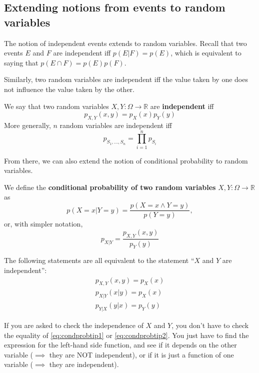 \documentclass{report}
\begin{document}
\subsection{Extending notions from events to random variables}
The notion of independent events extends to random variables. Recall that two events $E$ and $F$ are independent iff $p(E|F) = p(E)$, which is equivalent to saying that $p(E \cap F) = p(E)p(F)$. 

Similarly, two random variables are independent iff the value taken by one does not influence the value taken by the other.

\begin{defn}
	We say that two random variables $X, Y: \Omega \to \mathbb{R}$ are \textbf{independent} iff 
	\begin{equation}
		p_{X, Y}(x,y) = p_X(x)p_Y(y)
	\end{equation}
	More generally, $n$ random variables are independent iff
	\begin{equation}
		p_{S_1, \ldots, S_n} = \prod_{i=1}^n p_{S_i}
	\end{equation}
\end{defn}

\noindent From there, we can also extend the notion of conditional probability to random variables.
\begin{defn}
We define the \textbf{conditional probability of two random variables} $X, Y: \Omega \to \mathbb{R}$ as
\begin{equation}
	p(X=x | Y=y) = \dfrac{p(X=x \land Y=y)}{p(Y=y)},
\end{equation}
or, with simpler notation,
\begin{equation}
	p_{X|Y} = \dfrac{p_{X, Y}(x, y)}{p_Y(y)}
\end{equation}
\end{defn}

\begin{remark} The following statements are all equivalent to the statement ``$X$ and $Y$ are independent'':
\begin{align}
	p_{X, Y}(x, y) = p_X(x) \\
	\label{eq:condprobtip1}
	p_{X|Y}(x|y) = p_X(x) \\
	\label{eq:condprobtip2}
	p_{Y|X}(y|x) = p_Y(y)
\end{align}
\end{remark}

\begin{remark} If you are asked to check the independence of $X$ and $Y$, you don't have to check the equality of \eqref{eq:condprobtip1} or \eqref{eq:condprobtip2}. You just have to find the expression for the left-hand side function, and see if it depends on the other variable ($\implies$ they are NOT independent), or if it is just a function of one variable ($\implies$ they are independent).
\end{remark}
\end{document}

